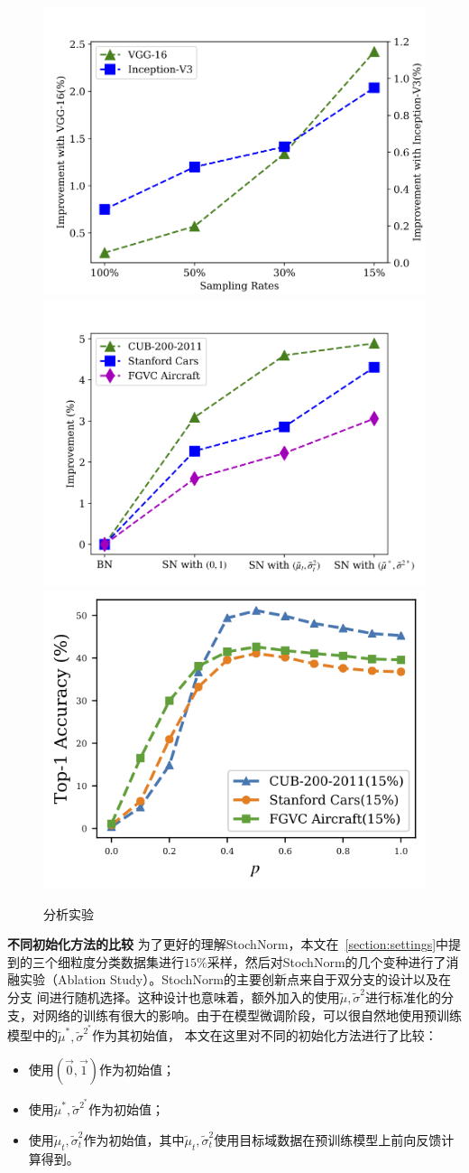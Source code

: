 \begin{figure}
  \centering
    {\includegraphics[width=0.48\linewidth]{figures/backbone.png}}
    {\includegraphics[width=0.48\linewidth]{figures/method.png}}
    {\includegraphics[width=0.48\linewidth]{figures/p_acc.png}}
  \caption{分析实验}
\end{figure}

\textbf{不同初始化方法的比较 } 为了更好的理解StochNorm，本文在~\ref{section:settings}中提到的三个细粒度分类数据集进行$15\%$采样，然后对StochNorm的几个变种进行了消融实验（Ablation Study）。StochNorm的主要创新点来自于双分支的设计以及在分支
间进行随机选择。这种设计也意味着，额外加入的使用$\tilde{\mu}, \tilde{\sigma}^2$进行标准化的分支，对网络的训练有很大的影响。由于在模型微调阶段，可以很自然地使用预训练模型中的$\tilde{\mu}^*, \tilde{\sigma}^{2^*}$作为其初始值，
本文在这里对不同的初始化方法进行了比较：
\begin{itemize}
  \item 使用$(\vec{0}, \vec{1})$作为初始值；
  \item 使用$\tilde{\mu}^*, \tilde{\sigma}^{2^*}$作为初始值；
  \item 使用$\tilde{\mu}_t, \tilde{\sigma}_t^2$作为初始值，其中$\tilde{\mu}_t, \tilde{\sigma}_t^2$使用目标域数据在预训练模型上前向反馈计算得到。
\end{itemize}

